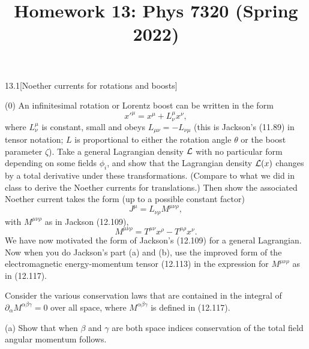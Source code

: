\documentclass[12pt]{article}
\title{Homework 13: Phys 7320 (Spring 2022)}
\begin{document}
\maketitle
\begin{problem}{13.1}[Noether currents for rotations and boosts]

(0) An infinitesimal rotation or Lorentz boost can be written in the form
\begin{equation}\label{p10:xp}
    x'^\mu=x^\mu+L^\mu_\nu x^\nu, 
\end{equation}
where $L^\mu_\nu$ is constant, small and obeys $L_{\mu\nu}=-L_{\nu\mu}$ (this is
Jackson's (11.89) in tensor notation; $L$ is proportional to either the
rotation angle $\theta$ or the boost parameter $\zeta$). Take a general
Lagrangian density $\mathcal{L}$ with no particular form depending on some fields
$\phi_i$, and show that the Lagrangian density $\mathcal{L}(x)$ changes by a total
derivative under these transformations. (Compare to what we did in class to
derive the Noether currents for translations.) Then show the associated Noether
current takes the form (up to a possible constant factor)
\begin{equation}
    J^\mu=L_{\nu\rho}M^{\mu\nu\rho}, 
\end{equation}
with $M^{\mu\nu\rho}$ as in Jackson (12.109),
\begin{equation}
    M^{\mu\nu\rho}=T^{\mu\nu}x^\rho-T^{\mu\rho} x^\nu. 
\end{equation}
We have now motivated the form of Jackson's (12.109) for a general Lagrangian.
Now when you do Jackson's part (a) and (b), use the improved form of the
electromagnetic energy-momentum tensor (12.113) in the expression for
$M^{\mu\nu\rho}$ as in (12.117).

Consider the various conservation laws that are contained in the integral of
$\partial_\alpha M^{\alpha\beta\gamma}=0$ over all space, where
$M^{\alpha\beta\gamma}$ is defined in (12.117).

(a) Show that when $\beta$ and $\gamma$ are both space indices conservation of
the total field angular momentum follows.


\end{problem}
\end{document}
